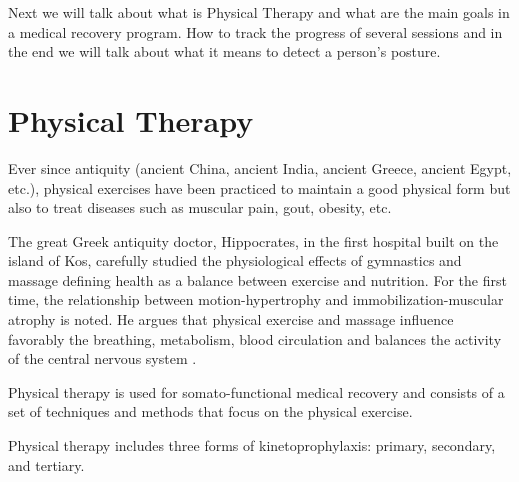 Next we will talk about what is Physical Therapy and what are the main goals in a medical recovery program.
How to track the progress of several sessions and 
in the end we will talk about what it means to detect a person's posture.

\section{Physical Therapy}

Ever since antiquity (ancient China, ancient India, ancient Greece, ancient Egypt, etc.), 
physical exercises have been practiced to maintain a good physical
form but also to treat diseases such as muscular pain, gout, obesity, etc.


The great Greek antiquity doctor, Hippocrates, in the first hospital built on the island of Kos, 
carefully studied the physiological effects of gymnastics and massage defining health as a
 balance between exercise and nutrition. For the first time, the relationship between motion-hypertrophy and 
 immobilization-muscular atrophy is noted. He argues that physical exercise and massage influence favorably 
 the breathing, metabolism, blood circulation and balances the activity of the central nervous system \cite{book.history.rehab.1991}. 


 Physical therapy is used for somato-functional medical recovery and 
 consists of a set of techniques and methods that focus on the physical exercise.

 Physical therapy includes three forms of kinetoprophylaxis: primary, secondary, and tertiary.

